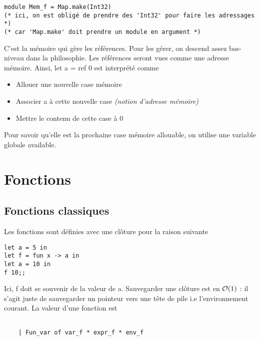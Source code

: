 \documentclass{article}
\newcommand\code[1]{{\fontfamily{lmtt}\selectfont #1}}
\begin{document}
	\begin{verbatim}
module Mem_f = Map.make(Int32)
(* ici, on est obligé de prendre des 'Int32' pour faire les adressages *)
(* car 'Map.make' doit prendre un module en argument *)
	\end{verbatim}
	
	\vspace{0.5cm}

	C'est la mémoire qui gère les références. Pour les gérer, on descend assez bas-niveau dans la philosophie. Les références seront vues comme une adresse mémoire. Ainsi, \code{let a = ref 0} est interprété comme

	\vspace{0.5cm}

\begin{itemize}
	\item Allouer une nouvelle case mémoire
	\item Associer \code{a} à cette nouvelle case \emph{(notion d'adresse mémoire)}
	\item Mettre le contenu de cette case à $0$
\end{itemize}

	\vspace{0.5cm}
	
	Pour savoir qu'elle est la prochaine case mémoire allouable, on utilise une variable globale \code{available}.
	
\section{Fonctions}

	\subsection{Fonctions classiques}

	Les fonctions sont définies avec une clôture pour la raison suivante 
	
	\begin{verbatim}
let a = 5 in
let f = fun x -> a in
let a = 10 in
f 10;;
	\end{verbatim}
	
	Ici, \code{f} doit se souvenir de la valeur de \code{a}. Sauvegarder une clôture est en ${\cal{O}}(1)$ : il s'agit juste de sauvegarder un pointeur vers une tête de pile i.e l'environnement courant. La valeur d'une fonction est 
	
	\begin{verbatim}
	
	| Fun_var of var_f * expr_f * env_f 
	
	\end{verbatim}
	
\end{document}
